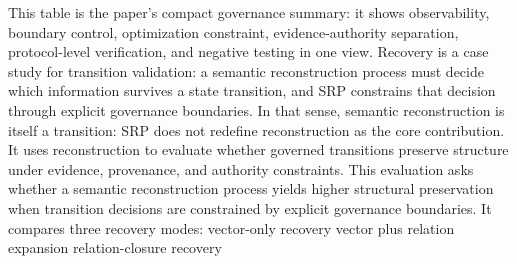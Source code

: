 {}\markdownRendererInterblockSeparator
{}\markdownRendererInterblockSeparator
{}This table is the paper's compact governance summary: it shows observability, boundary control, optimization constraint, evidence-authority separation, protocol-level verification, and negative testing in one view.\markdownRendererInterblockSeparator
{}
\markdownRendererSectionEnd \markdownRendererSectionBegin
{}\markdownRendererInterblockSeparator
{}\markdownRendererSectionBegin
{}\markdownRendererInterblockSeparator
{}Recovery is a case study for transition validation: a semantic reconstruction process must decide which information survives a state transition, and SRP constrains that decision through explicit governance boundaries.\markdownRendererParagraphSeparator
{}In that sense, semantic reconstruction is itself a transition:\markdownRendererInterblockSeparator
{}\markdownRendererInterblockSeparator
{}SRP does not redefine reconstruction as the core contribution. It uses reconstruction to evaluate whether governed transitions preserve structure under evidence, provenance, and authority constraints.\markdownRendererInterblockSeparator
{}
\markdownRendererSectionEnd \markdownRendererSectionBegin
{}\markdownRendererInterblockSeparator
{}This evaluation asks whether a semantic reconstruction process yields higher structural preservation when transition decisions are constrained by explicit governance boundaries.\markdownRendererParagraphSeparator
{}It compares three recovery modes:\markdownRendererInterblockSeparator
{}\markdownRendererUlBeginTight
\markdownRendererUlItem vector-only recovery\markdownRendererUlItemEnd 
\markdownRendererUlItem vector plus relation expansion\markdownRendererUlItemEnd 
\markdownRendererUlItem relation-closure recovery\markdownRendererUlItemEnd 
\markdownRendererUlEndTight \markdownRendererInterblockSeparator
{}\markdownRendererInterblockSeparator
{}\markdownRendererInterblockSeparator
{}
\markdownRendererSectionEnd \markdownRendererSectionBegin
